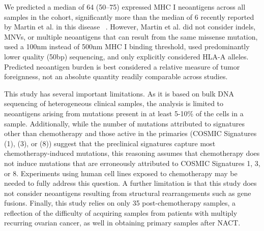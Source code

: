 We predicted a median of 64 (50--75) expressed MHC I neoantigens across all samples in the cohort, significantly more than the median of 6 recently reported by Martin et al. in this disease ~\cite{Martin_2016}. However, Martin et al. did not consider indels, MNVs, or multiple neoantigens that can result from the same missense mutation, used a 100nm instead of 500nm MHC I binding threshold, used predominantly lower quality (50bp) sequencing, and only explicitly considered HLA-A alleles. Predicted neoantigen burden is best considered a relative measure of tumor foreignness, not an absolute quantity readily comparable across studies.

This study has several important limitations. As it is based on bulk DNA sequencing of heterogeneous clinical samples, the analysis is limited to neoantigens arising from mutations present in at least 5-10\% of the cells in a sample. Additionally, while the number of mutations attributed to signatures other than chemotherapy and those active in the primaries (COSMIC Signatures (1), (3), or (8)) suggest that the preclinical signatures capture most chemotherapy-induced mutations, this reasoning assumes that chemotherapy does not induce mutations that are erroneously attributed to COSMIC Signatures 1, 3, or 8. Experiments using human cell lines exposed to chemotherapy may be needed to fully address this question. A further limitation is that this study does not consider neoantigens resulting from structural rearrangements such as gene fusions. Finally, this study relies on only 35 post-chemotherapy samples, a reflection of the difficulty of acquiring samples from patients with multiply recurring ovarian cancer, as well in obtaining primary samples after NACT.